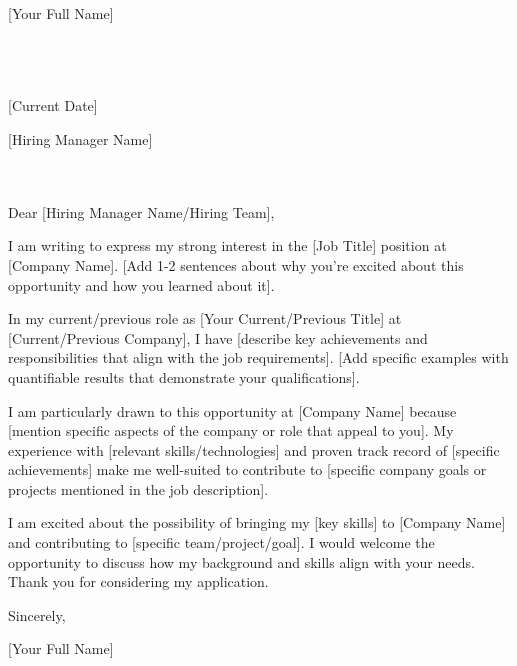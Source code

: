 \documentclass[11pt,a4paper]{article}
\begin{document}
[Your Full Name]\\
[Your Address]\\
[City, State ZIP Code]\\
[Your Email]\\
[Your Phone Number]

\vspace{8mm}

[Current Date]

\vspace{8mm}

[Hiring Manager Name]\\
[Company Name]\\
[Company Address]\\
[City, State ZIP Code]

\vspace{8mm}

Dear [Hiring Manager Name/Hiring Team],

I am writing to express my strong interest in the [Job Title] position at [Company Name]. [Add 1-2 sentences about why you're excited about this opportunity and how you learned about it].

In my current/previous role as [Your Current/Previous Title] at [Current/Previous Company], I have [describe key achievements and responsibilities that align with the job requirements]. [Add specific examples with quantifiable results that demonstrate your qualifications].

I am particularly drawn to this opportunity at [Company Name] because [mention specific aspects of the company or role that appeal to you]. My experience with [relevant skills/technologies] and proven track record of [specific achievements] make me well-suited to contribute to [specific company goals or projects mentioned in the job description].

I am excited about the possibility of bringing my [key skills] to [Company Name] and contributing to [specific team/project/goal]. I would welcome the opportunity to discuss how my background and skills align with your needs. Thank you for considering my application.

\vspace{8mm}

Sincerely,

\vspace{12mm}

[Your Full Name]
\end{document}
